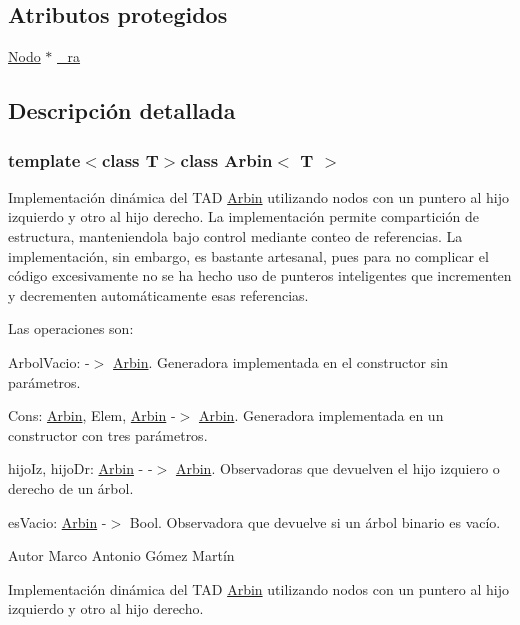 \subsection*{\-Atributos protegidos}
\begin{DoxyCompactItemize}
\item 
\hyperlink{class_arbin_1_1_nodo}{\-Nodo} $\ast$ \hyperlink{class_arbin_a543204acfeec16e5e9e3623411ed4a45}{\-\_\-ra}
\end{DoxyCompactItemize}


\subsection{\-Descripción detallada}
\subsubsection*{template$<$class T$>$class Arbin$<$ T $>$}

\-Implementación dinámica del \-T\-A\-D \hyperlink{class_arbin}{\-Arbin} utilizando nodos con un puntero al hijo izquierdo y otro al hijo derecho. \-La implementación permite compartición de estructura, manteniendola bajo control mediante conteo de referencias. \-La implementación, sin embargo, es bastante artesanal, pues para no complicar el código excesivamente no se ha hecho uso de punteros inteligentes que incrementen y decrementen automáticamente esas referencias.

\-Las operaciones son\-:


\begin{DoxyItemize}
\item \-Arbol\-Vacio\-: -\/$>$ \hyperlink{class_arbin}{\-Arbin}. \-Generadora implementada en el constructor sin parámetros.
\item \-Cons\-: \hyperlink{class_arbin}{\-Arbin}, \-Elem, \hyperlink{class_arbin}{\-Arbin} -\/$>$ \hyperlink{class_arbin}{\-Arbin}. \-Generadora implementada en un constructor con tres parámetros.
\item hijo\-Iz, hijo\-Dr\-: \hyperlink{class_arbin}{\-Arbin} -\/ -\/$>$ \hyperlink{class_arbin}{\-Arbin}. \-Observadoras que devuelven el hijo izquiero o derecho de un árbol.
\item es\-Vacio\-: \hyperlink{class_arbin}{\-Arbin} -\/$>$ \-Bool. \-Observadora que devuelve si un árbol binario es vacío.
\end{DoxyItemize}

\begin{DoxyAuthor}{\-Autor}
\-Marco \-Antonio \-Gómez \-Martín
\end{DoxyAuthor}
\-Implementación dinámica del \-T\-A\-D \hyperlink{class_arbin}{\-Arbin} utilizando nodos con un puntero al hijo izquierdo y otro al hijo derecho.

